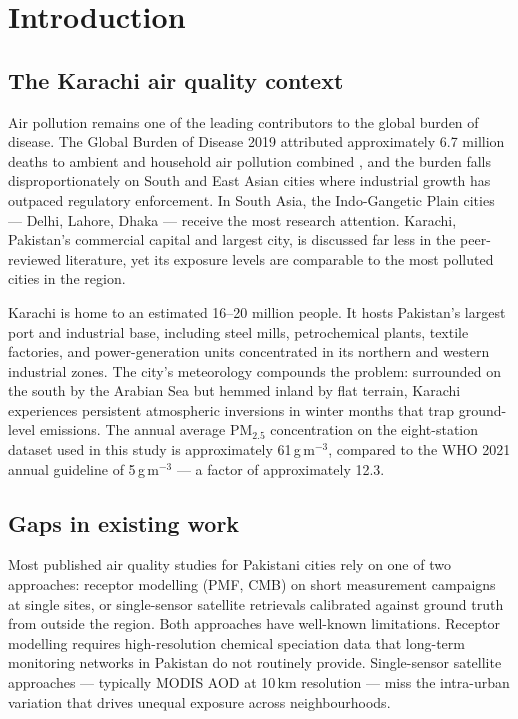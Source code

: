 \documentclass{iopjournal}
\begin{document}
\section{Introduction}

\subsection{The Karachi air quality context}

Air pollution remains one of the leading contributors to the global
burden of disease. The Global Burden of Disease 2019 attributed
approximately 6.7 million deaths to ambient and household air
pollution combined \cite{GBD2019}, and the burden falls
disproportionately on South and East Asian cities where industrial
growth has outpaced regulatory enforcement. In South Asia, the
Indo-Gangetic Plain cities --- Delhi, Lahore, Dhaka --- receive the
most research attention. Karachi, Pakistan's commercial capital and
largest city, is discussed far less in the peer-reviewed literature,
yet its exposure levels are comparable to the most polluted cities in
the region.

Karachi is home to an estimated 16--20 million people. It hosts
Pakistan's largest port and industrial base, including steel mills,
petrochemical plants, textile factories, and power-generation units
concentrated in its northern and western industrial zones. The city's
meteorology compounds the problem: surrounded on the south by the
Arabian Sea but hemmed inland by flat terrain, Karachi experiences
persistent atmospheric inversions in winter months that trap
ground-level emissions. The annual average PM$_{2.5}$ concentration
on the eight-station dataset used in this study is approximately
61\,\textmu g\,m$^{-3}$, compared to the WHO 2021 annual guideline of
5\,\textmu g\,m$^{-3}$ --- a factor of approximately 12.3.

\subsection{Gaps in existing work}

Most published air quality studies for Pakistani cities rely on one of
two approaches: receptor modelling (PMF, CMB) on short measurement
campaigns at single sites, or single-sensor satellite retrievals
calibrated against ground truth from outside the region. Both
approaches have well-known limitations. Receptor modelling requires
high-resolution chemical speciation data that long-term monitoring
networks in Pakistan do not routinely provide. Single-sensor satellite
approaches --- typically MODIS AOD at 10\,km resolution --- miss the
intra-urban variation that drives unequal exposure across
neighbourhoods.
\end{document}
